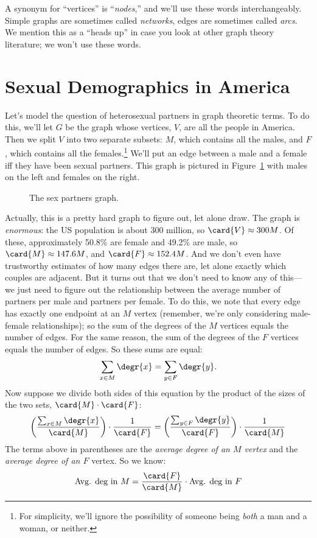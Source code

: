 A synonym for ``vertices'' is ``\emph{nodes},'' and we'll use these
words interchangeably.  Simple graphs are sometimes
called \emph{networks}, edges are sometimes called \emph{arcs}.  We
mention this as a ``heads up'' in case you look at other graph theory
literature; we won't use these words.

\section{Sexual Demographics in America}\label{sexam}

Let's model the question of heterosexual partners in graph theoretic
terms.  To do this, we'll let $G$ be the graph whose vertices, $V$,
are all the people in America.  Then we split $V$ into two separate
subsets: $M$, which contains all the males, and $F$, which contains
all the females.\footnote{For simplicity, we'll ignore the possibility
  of someone being \emph{both} a man and a woman, or neither.}  We'll
put an edge between a male and a female iff they have been sexual
partners.  This graph is pictured in Figure~\ref{fig:partners} with
males on the left and females on the right.

\begin{figure}
\caption{The sex partners graph.}
\label{fig:partners}
\end{figure}

Actually, this is a pretty hard graph to figure out, let alone draw.
The graph is \emph{enormous}: the US population is about 300 million,
so $\card{V} \approx 300M$.  Of these, approximately 50.8\% are female
and 49.2\% are male, so $\card{M} \approx 147.6M$, and $\card{F}
\approx 152.4M$.  And we don't even have trustworthy estimates of how
many edges there are, let alone exactly which couples are adjacent.
But it turns out that we don't need to know any of this---we just need
to figure out the relationship between the average number of partners
per male and partners per female.  To do this, we note that every edge
has exactly one endpoint at an $M$ vertex (remember, we're only
considering male-female relationships); so the sum of the degrees of
the $M$ vertices equals the number of edges.  For the same reason, the
sum of the degrees of the $F$ vertices equals the number of edges.  So
these sums are equal:
%
\[
\sum_{x \in M} \degr{x} = \sum_{y \in F} \degr{y}.
\]
%
Now suppose we divide both sides of this equation by the product of the sizes of the
two sets, $\card{M} \cdot \card{F}$:
%
\[
\left(\frac{\sum_{x \in M} \degr{x}}{\card{M}}\right) \cdot \frac{1}{\card{F}} =
\left(\frac{\sum_{y \in F} \degr{y}}{\card{F}}\right) \cdot \frac{1}{\card{M}}
\]
%
The terms above in parentheses are the \emph{average degree of an $M$ vertex} and
  the \emph{average degree of an $F$} vertex.  So we know:
\begin{equation}\label{avgsexMF}
\text{Avg. deg in $M$} = \frac{\card{F}}{\card{M}} \cdot \text{Avg. deg in $F$}
\end{equation}

